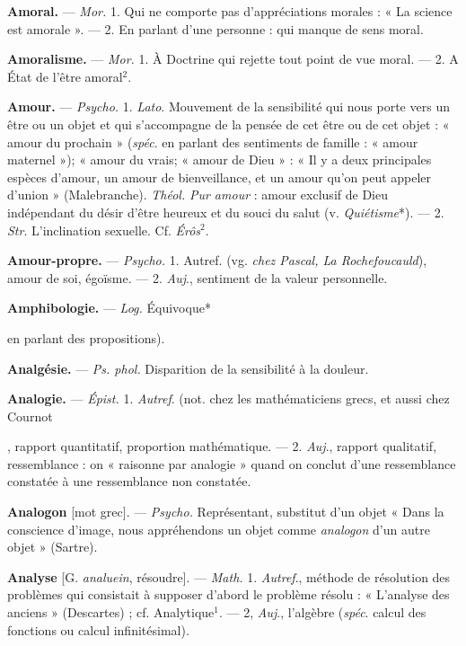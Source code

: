 \begin{itemize}[leftmargin=1cm, label=, itemsep=1pt]
{{{{\item {\bf Amoral.} — \textsf{\textit {Mor.}} 1. Qui ne comporte
pas d'appréciations morales : « La
science est amorale ». — 2. En parlant d’une personne : qui manque
de sens moral.

\item {\bf Amoralisme.} — \textsf{\textit {Mor.}} 1. À Doctrine qui
rejette tout point de vue moral. —
2. A État de l'être amoral$^2$.

\item {\bf Amour.} — \textsf{\textit {Psycho.}} 1. {\it Lato}.
Mouvement de la sensibilité qui nous porte
vers un être ou un objet et qui s’accompagne de la pensée de cet être
ou de cet objet : « amour du prochain » ({\it spéc}. en parlant des
sentiments de famille : « amour maternel »); « amour du vrais; « amour de
Dieu » : « Il y a deux principales
espèces d'amour, un amour de bienveillance, et un amour qu'on peut
appeler d’union » (Malebranche).
\textsf{\textit {Théol.}} {\it Pur amour} : amour exclusif
de Dieu indépendant du désir d’être
heureux et du souci du salut (v.
{\it Quiétisme}*). — 2. {\it Str}. L’inclination
sexuelle. Cf. {\it Érôs}$^2$.

\item {\bf Amour-propre.} — \textsf{\textit {Psycho.}} 1. Autref.
(vg. {\it chez Pascal, La Rochefoucauld}),
amour de soi, égoïsme. — 2. {\it Auj}.,
sentiment de la valeur personnelle.

\item {\bf Amphibologie.} — \textsf{\textit {Log.}} Équivoque*
{en parlant des propositions).

\item {\bf Analgésie.} — \textsf{\textit {Ps. phol.}} Disparition
de la sensibilité à la douleur.

\item {\bf Analogie.} — \textsf{\textit {Épist.}} 1. {\it Autref}. (not.
chez les mathématiciens grecs, et
aussi chez Cournot}, rapport quantitatif, proportion mathématique. —
2. {\it Auj}., rapport qualitatif, ressemblance : on « raisonne par analogie »
quand on conclut d’une ressemblance constatée à une ressemblance
non constatée.

\item {\bf Analogon} [mot grec]. — \textsf{\textit {Psycho.}} Représentant,
substitut d'un objet
« Dans la conscience d'image, nous
appréhendons un objet comme {\it analogon} d’un autre objet » (Sartre).

\item {\bf Analyse} [G. {\it analuein}, résoudre]. —
\textsf{\textit {Math.}} 1. {\it Autref}., méthode de résolution des problèmes qui consistait
à supposer d’abord le problème résolu : « L'analyse des anciens »
(Descartes) ; cf. {\it }Analytique$^1$. — 2,
{\it Auj}., l'algèbre ({\it spéc}. calcul des fonctions ou calcul infinitésimal).

}}}}
\end{itemize}
